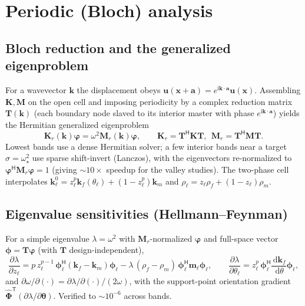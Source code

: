 \documentclass[11pt]{article}
\newcommand{\vth}{\bm{\theta}}
\newcommand{\vu}{\mathbf{u}}
\newcommand{\vK}{\mathbf{K}}
\newcommand{\vM}{\mathbf{M}}
\newcommand{\vT}{\mathbf{T}}
\newcommand{\vPhi}{\hat{\bm{\Phi}}}
\newcommand{\rmd}{\,\mathrm{d}}
\newcommand{\ii}{\mathrm{i}}
\newcommand{\T}{^{\mathsf{T}}}
\newcommand{\HH}{^{\mathsf{H}}}
\begin{document}
\section{Periodic (Bloch) analysis}
\subsection{Bloch reduction and the generalized eigenproblem}
For a wavevector $\mathbf k$ the displacement obeys $\vu(\mathbf x+\mathbf a)=
e^{\ii\mathbf k\cdot\mathbf a}\vu(\mathbf x)$. Assembling $\vK,\vM$ on the open
cell and imposing periodicity by a complex reduction matrix $\vT(\mathbf k)$
(each boundary node slaved to its interior master with phase $e^{\ii\mathbf k
\cdot\mathbf a}$) yields the Hermitian generalized eigenproblem
\begin{equation}
  \vK_r(\mathbf k)\bm\varphi=\omega^2\vM_r(\mathbf k)\bm\varphi,\qquad
  \vK_r=\vT\HH\vK\vT,\ \ \vM_r=\vT\HH\vM\vT.
  \label{eq:bloch}
\end{equation}
Lowest bands use a dense Hermitian solver; a few interior bands near a target
$\sigma=\omega_\star^2$ use sparse shift-invert (Lanczos), with the eigenvectors
re-normalized to $\bm\varphi\HH\vM_r\bm\varphi=1$ (giving $\sim\!10\times$
speedup for the valley studies). The two-phase cell interpolates
$\mathbf{k}^0_\ell=z_\ell^p\mathbf{k}_f(\theta_\ell)+(1-z_\ell^p)\mathbf{k}_m$ and
$\rho_\ell=z_\ell\rho_f+(1-z_\ell)\rho_m$.

\subsection{Eigenvalue sensitivities (Hellmann--Feynman)}
For a simple eigenvalue $\lambda=\omega^2$ with $\vM_r$-normalized $\bm\varphi$
and full-space vector $\bm\phi=\vT\bm\varphi$ (with $\vT$ design-independent),
\begin{equation}
  \frac{\partial\lambda}{\partial z_\ell}
  =p\,z_\ell^{p-1}\,\bm\phi_\ell\HH(\mathbf{k}_f-\mathbf{k}_m)\bm\phi_\ell
  -\lambda\,(\rho_f-\rho_m)\,\bm\phi_\ell\HH\mathbf{m}_\ell\bm\phi_\ell,\qquad
  \frac{\partial\lambda}{\partial\theta_\ell}
  =z_\ell^p\,\bm\phi_\ell\HH\frac{\rmd\mathbf{k}_f}{\rmd\theta}\bm\phi_\ell,
  \label{eq:hf}
\end{equation}
and $\partial\omega/\partial(\cdot)=\partial\lambda/\partial(\cdot)/(2\omega)$,
with the support-point orientation gradient $\vPhi\T(\partial\lambda/\partial
\vth)$. Verified to $\sim\!10^{-6}$ across bands.
\end{document}
